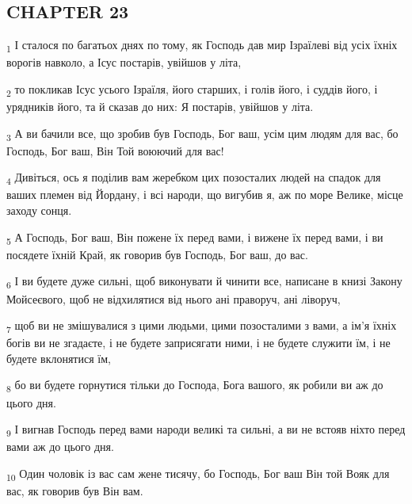 \subsection{CHAPTER 23}
\begin{tcolorbox}
\textsubscript{1} І сталося по багатьох днях по тому, як Господь дав мир Ізраїлеві від усіх їхніх ворогів навколо, а Ісус постарів, увійшов у літа,
\end{tcolorbox}
\begin{tcolorbox}
\textsubscript{2} то покликав Ісус усього Ізраїля, його старших, і голів його, і суддів його, і урядників його, та й сказав до них: Я постарів, увійшов у літа.
\end{tcolorbox}
\begin{tcolorbox}
\textsubscript{3} А ви бачили все, що зробив був Господь, Бог ваш, усім цим людям для вас, бо Господь, Бог ваш, Він Той воюючий для вас!
\end{tcolorbox}
\begin{tcolorbox}
\textsubscript{4} Дивіться, ось я поділив вам жеребком цих позосталих людей на спадок для ваших племен від Йордану, і всі народи, що вигубив я, аж по море Велике, місце заходу сонця.
\end{tcolorbox}
\begin{tcolorbox}
\textsubscript{5} А Господь, Бог ваш, Він пожене їх перед вами, і вижене їх перед вами, і ви посядете їхній Край, як говорив був Господь, Бог ваш, до вас.
\end{tcolorbox}
\begin{tcolorbox}
\textsubscript{6} І ви будете дуже сильні, щоб виконувати й чинити все, написане в книзі Закону Мойсеєвого, щоб не відхилятися від нього ані праворуч, ані ліворуч,
\end{tcolorbox}
\begin{tcolorbox}
\textsubscript{7} щоб ви не змішувалися з цими людьми, цими позосталими з вами, а ім'я їхніх богів ви не згадаєте, і не будете заприсягати ними, і не будете служити їм, і не будете вклонятися їм,
\end{tcolorbox}
\begin{tcolorbox}
\textsubscript{8} бо ви будете горнутися тільки до Господа, Бога вашого, як робили ви аж до цього дня.
\end{tcolorbox}
\begin{tcolorbox}
\textsubscript{9} І вигнав Господь перед вами народи великі та сильні, а ви не встояв ніхто перед вами аж до цього дня.
\end{tcolorbox}
\begin{tcolorbox}
\textsubscript{10} Один чоловік із вас сам жене тисячу, бо Господь, Бог ваш Він той Вояк для вас, як говорив був Він вам.
\end{tcolorbox}
